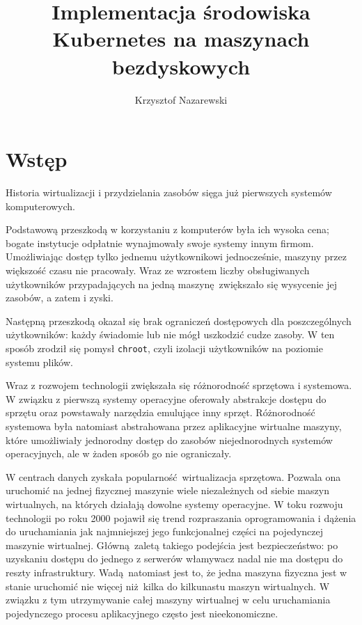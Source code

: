 \documentclass[a4paper,12pt,twoside,openany]{report}
\title{Implementacja środowiska Kubernetes na maszynach bezdyskowych}
\author{Krzysztof Nazarewski}
\newcommand{\passthrough}[1]{#1}
\begin{document}
\maketitle
\hypertarget{wstux119p}{%
\chapter{Wstęp}\label{wstux119p}}

Historia wirtualizacji i przydzielania zasobów sięga już pierwszych
systemów komputerowych.

Podstawową przeszkodą w korzystaniu z komputerów była ich wysoka cena;
bogate instytucje odpłatnie wynajmowały swoje systemy innym firmom.
Umożliwiając dostęp tylko jednemu użytkownikowi jednocześnie, maszyny
przez większość czasu nie pracowały. Wraz ze wzrostem liczby
obsługiwanych użytkowników przypadających na jedną maszynę~zwiększało
się wysycenie jej zasobów, a zatem i zyski.

Następną przeszkodą okazał się brak ograniczeń dostępowych dla
poszczególnych użytkowników: każdy świadomie lub nie mógł uszkodzić
cudze zasoby. W ten sposób zrodził się pomysł
\passthrough{\lstinline!chroot!}, czyli izolacji użytkowników na
poziomie systemu plików.

Wraz z rozwojem technologii zwiększała się różnorodność sprzętowa i
systemowa. W związku z pierwszą systemy operacyjne oferowały abstrakcje
dostępu do sprzętu oraz powstawały narzędzia emulujące inny sprzęt.
Różnorodność systemowa była natomiast abstrahowana przez aplikacyjne
wirtualne maszyny, które umożliwiały jednorodny dostęp do zasobów
niejednorodnych systemów operacyjnych, ale w żaden sposób go nie
ograniczały.

W centrach danych zyskała popularność~wirtualizacja sprzętowa. Pozwala
ona uruchomić na jednej fizycznej maszynie wiele niezależnych od siebie
maszyn wirtualnych, na których działają dowolne systemy operacyjne. W
toku rozwoju technologii po roku 2000 pojawił się trend rozpraszania
oprogramowania i dążenia do uruchamiania jak najmniejszej jego
funkcjonalnej części na pojedynczej maszynie wirtualnej. Główną~zaletą
takiego podejścia jest bezpieczeństwo: po uzyskaniu dostępu do jednego z
serwerów włamywacz nadal nie ma dostępu do reszty infrastruktury.
Wadą~natomiast jest to, że jedna maszyna fizyczna jest w stanie
uruchomić nie więcej niż~kilka do kilkunastu maszyn wirtualnych. W
związku z tym utrzymywanie całej maszyny wirtualnej w celu uruchamiania
pojedynczego procesu aplikacyjnego często jest nieekonomiczne.
\end{document}
